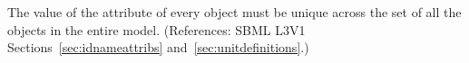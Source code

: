 The value of the attribute  of every \UnitDefinition object must
be unique across the set of all the \UnitDefinition objects in the entire
model.  (References: SBML L3V1 Sections~\ref{sec:idnameattribs}
and~\ref{sec:unitdefinitions}.)
